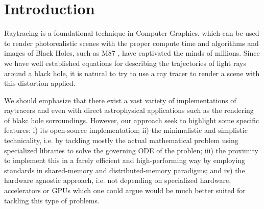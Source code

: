 


\section{Introduction}
\label{sec:intro}



Raytracing is a foundational technique in Computer Graphics, which can be used to render photorealistic scenes with the proper compute time and algorithms and images of Black Holes, such as M87 \cite{M87_EHT_i}, have captivated the minds of millions. Since we have well established equations for describing the trajectories of light rays around a black hole, it is natural to try to use a ray tracer to render a scene with this distortion applied.

We should emphasize that there exist a vast variety of implementations
of raytracers
\cite{sharma2023mahakalapythonbasedmodularraytracing,James_2015,imbens2023graphicalprocessinggeodesicpropagation}
and even with direct astrophysical applications such as
the rendering of blakc hole sorroundings.
However, our approach seek to highlight some specific features:
i) its open-source implementation;
ii) the minimalistic and simplistic technicality, i.e. by tackling
mostly the actual mathematical problem using specialized libraries
to solve the governing ODE of the problen;
iii) the proximity to implement this in a farely efficient and high-performing
way by employing standards in shared-memory and distributed-memory paradigms;
and iv) the hardware agnostic approach, i.e. not depending on specialized hardware, accelerators or GPUs which one could argue would be much better suited for tackling this type of problems.

